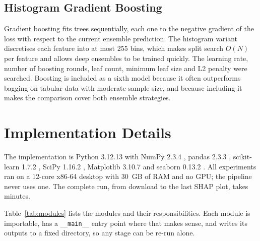 \subsection{Histogram Gradient Boosting}

Gradient boosting fits trees sequentially, each one to the negative gradient of
the loss with respect to the current ensemble prediction. The histogram variant
discretises each feature into at most 255 bins, which makes split search
$O(N)$ per feature and allows deep ensembles to be trained quickly. The learning
rate, number of boosting rounds, leaf count, minimum leaf size and L2 penalty were
searched. Boosting is included as a sixth model because it often outperforms
bagging on tabular data with moderate sample size, and because including it makes
the comparison cover both ensemble strategies.

\section{Implementation Details}

The implementation is Python 3.12.13 with NumPy 2.3.4 \cite{harris2020},
pandas 2.3.3 \cite{mckinney2010}, scikit-learn 1.7.2 \cite{pedregosa2011},
SciPy 1.16.2 \cite{virtanen2020}, Matplotlib 3.10.7 \cite{hunter2007} and
seaborn 0.13.2 \cite{waskom2021}. All
experiments ran on a 12-core x86-64 desktop with 30~GB of RAM and no GPU; the
pipeline never uses one. The complete run, from download to the last SHAP plot,
takes \PipelineMinutes{} minutes.

Table~\ref{tab:modules} lists the modules and their responsibilities. Each module
is importable, has a \texttt{\_\_main\_\_} entry point where that makes sense, and
writes its outputs to a fixed directory, so any stage can be re-run alone.

